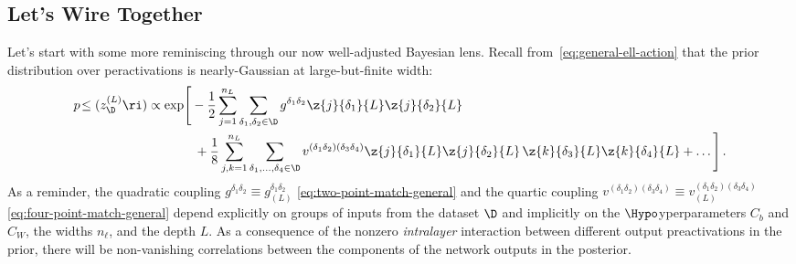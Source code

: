 \subsection{Let's Wire Together}\label{subsec:presence-FF-Bayes}
Let's start with some more reminiscing 
through our now well-adjusted Bayesian lens. Recall from~\eqref{eq:general-ell-action} that the prior distribution over peractivations is nearly-Gaussian at large-but-finite width:
\begin{align}\label{eq:general-ell-action-reprint}
p\!\le(z^{(L)}_{\D}\ri)
&\propto\exp\!\Bigg[-\frac{1}{2}\sum_{j=1}^{n_{L}}\sum_{\delta_1,\delta_2\in\D} g^{\delta_1\delta_2} \z{j}{\delta_1}{L}\z{j}{\delta_2}{L}\, \\
&\quad \quad \quad \ \ +\frac{1}{8}\sum_{j,k=1}^{n_{L}}\sum_{\delta_1,\ldots,\delta_4\in\D}v^{(\delta_1\delta_2)(\delta_3\delta_4)} \z{j}{\delta_1}{L}\z{j}{\delta_2}{L}\, \z{k}{\delta_3}{L}\z{k}{\delta_4}{L}+\ldots\Bigg]\, .\nonumber%
\end{align}
As a reminder, the quadratic coupling $g^{\delta_1\delta_2}\equiv g^{\delta_1\delta_2}_{(L)}$ \eqref{eq:two-point-match-general} and the quartic coupling  $v^{(\delta_1\delta_2)(\delta_3\delta_4)}\equiv v^{(\delta_1\delta_2)(\delta_3\delta_4)}_{(L)}$ \eqref{eq:four-point-match-general} 
depend explicitly on groups of inputs
from the dataset $\D$ and implicitly on the $\Hypo$yperparameters $C_b$ and $C_W$, the widths $n_{\ell}$, and the depth $L$.
As a consequence of the nonzero \emph{intralayer} interaction between different output preactivations in the prior, there will be non-vanishing correlations between the components of the network outputs in the posterior.



